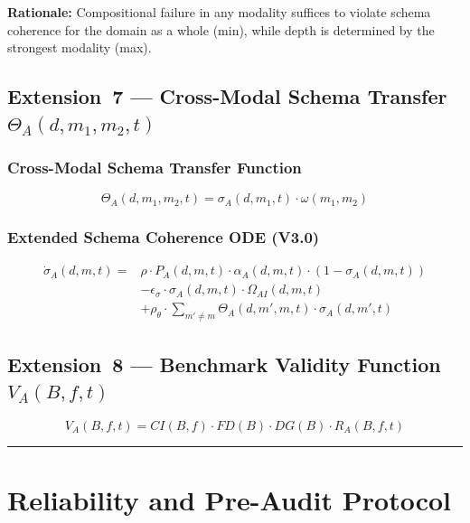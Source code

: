 \documentclass[11pt,a4paper]{article}
\begin{document}
\textbf{Rationale:} Compositional failure in any modality suffices to
violate schema coherence for the domain as a whole (min), while
depth is determined by the strongest modality (max).

\subsection{Extension~7 --- Cross-Modal Schema Transfer \texorpdfstring{$\Theta_A(d,m_1,m_2,t)$}{Theta\_A(d,m\_1,m\_2,t)}}\label{sec:cross-modal}

\subsubsection{Cross-Modal Schema Transfer Function}
\begin{equation}\label{eq:cross-modal-transfer}
\Theta_A(d, m_1, m_2, t) = \sigma_A(d, m_1, t) \cdot \omega(m_1, m_2)
\end{equation}

\subsubsection{Extended Schema Coherence ODE (V3.0)}
\begin{equation}\label{eq:sigma-ode-v3}
\begin{aligned}
\dot{\sigma}_A(d,m,t) = {} & \rho \cdot P_A(d,m,t) \cdot \alpha_A(d,m,t) \cdot (1 - \sigma_A(d,m,t)) \\
& - \epsilon_{\sigma} \cdot \sigma_A(d,m,t) \cdot \Omega_{AI}(d,m,t) \\
& + \rho_{\theta} \cdot \sum_{m' \neq m} \Theta_A(d,m',m,t) \cdot \sigma_A(d,m',t)
\end{aligned}
\end{equation}

\subsection{Extension~8 --- Benchmark Validity Function \texorpdfstring{$V_A(B,f,t)$}{V\_A(B,f,t)}}\label{sec:validity}

\begin{equation}\label{eq:validity-function}
V_A(B,f,t) = CI(B,f) \cdot FD(B) \cdot DG(B) \cdot R_A(B,f,t)
\end{equation}

\noindent\rule{\linewidth}{0.4pt}

\section{Reliability and Pre-Audit Protocol}\label{sec:reliability}
\end{document}
